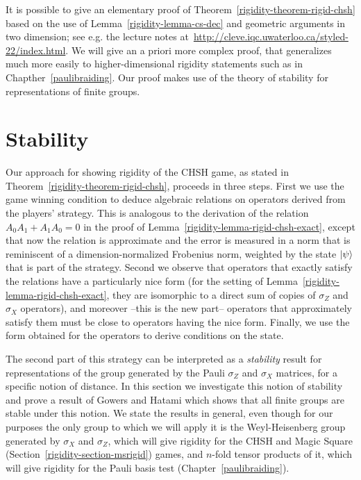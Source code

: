 It is possible to give an elementary proof of Theorem~\ref{rigidity-theorem-rigid-chsh} based on the use of Lemma~\ref{rigidity-lemma-cs-dec} and geometric arguments in two dimension; see e.g. the lecture notes at~\url{http://cleve.iqc.uwaterloo.ca/styled-22/index.html}. We will give an a priori more complex proof, that generalizes much more easily to higher-dimensional rigidity statements such as in Chapther~\ref{paulibraiding}. Our proof makes use of the theory of stability for representations of finite groups. 


\section{Stability}
\label{section-stability}

Our approach for showing rigidity of the CHSH game, as stated in Theorem~\ref{rigidity-theorem-rigid-chsh}, proceeds in three steps. First we use the game winning condition to deduce algebraic relations on operators derived from the players' strategy. This is analogous to the derivation of the relation $A_0A_1+A_1A_0=0$ in the proof of Lemma~\ref{rigidity-lemma-rigid-chsh-exact}, except that now the relation is approximate and the error is measured in a norm that is reminiscent of a dimension-normalized Frobenius norm, weighted by the state $|\psi\rangle$ that is part of the strategy. Second we observe that operators that exactly satisfy the relations have a particularly nice form (for the setting of Lemma~\ref{rigidity-lemma-rigid-chsh-exact}, they are isomorphic to a direct sum of copies of $\sigma_Z$ and $\sigma_X$ operators), and moreover --this is the new part-- operators that approximately satisfy them must be close to operators having the nice form. Finally, we use the form obtained for the operators to derive conditions on the state. 

The second part of this strategy can be interpreted as a \emph{stability} result for representations of the group generated by the Pauli $\sigma_Z$ and $\sigma_X$ matrices, for a specific notion of distance. In this section we investigate this notion of stability and prove a result of Gowers and Hatami which shows that all finite groups are stable under this notion. We state the results in general, even though for our purposes the only group to which we will apply it is the Weyl-Heisenberg group generated by $\sigma_X$ and $\sigma_Z$, which will give rigidity for the CHSH and Magic Square (Section~\ref{rigidity-section-msrigid}) games, and $n$-fold tensor products of it, which will give rigidity for the Pauli basis test (Chapter~\ref{paulibraiding}).


